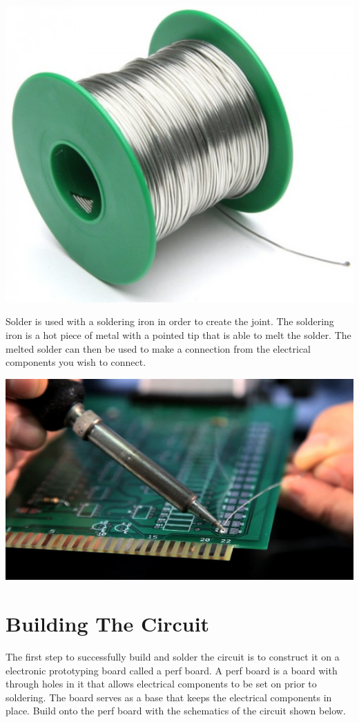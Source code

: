 \documentclass[11pt]{article}
\begin{document}
\centerline{
	\includegraphics[scale=.75]{exp11-solder}	
}

Solder is used with a soldering iron in order to create the joint. The soldering iron is a hot piece of metal with a pointed tip that is able to melt the solder. The melted solder can then be used to make a connection from the electrical components you wish to connect. 

\centerline{
	\includegraphics[scale=1.5]{exp11-iron}	
}
 
\section{Building The Circuit}
\label{sec-3}

The first step to successfully build and solder the circuit is to construct it on a electronic prototyping board called a perf board. A perf board is a board with through holes in it that allows electrical components to be set on prior to soldering. The board serves as a base that keeps the electrical components in place. Build onto the perf board with the schematics of the circuit shown below. 
\end{document}
